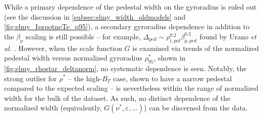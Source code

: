 While a primary dependence of the pedestal width on the gyroradius is ruled out (see the discussion in \cref{subsec:elmy_width_oldmodels} and \cref{fig:elmy_IprootneTe_p95}), a secondary gyroradius dependence in addition to the $\beta_{p}$ scaling is still possible -- for example, $\Delta_{ped} \sim \rho_{i,pol}^{0.2} \beta_{p,ped}^{0.5}$ found by Urano \emph{et al.} \cite{Urano2008}.  However, when the scale function $G$ is examined via trends of the normalized pedestal width versus normalized gyroradius $\rho^*_{95}$, shown in \cref{fig:elmy_rhostar_deltanorm}, no systematic dependence is seen.  Notably, the strong outlier for $\rho^*$ -- the high-$B_T$ case, shown to have a narrow pedestal compared to the expected scaling -- is nevertheless within the range of normalized width for the bulk of the dataset.  As such, no distinct dependence of the normalized width (equivalently, $G(\nu^*,\varepsilon,...)$) can be discerned from the data.\nicesectionending

\begin{figure}[ht]
 \pushtooutside
\end{figure}

